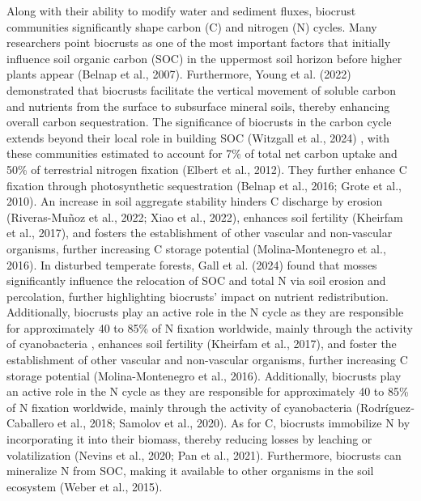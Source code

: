 Along with their ability to modify water and sediment fluxes, biocrust communities significantly shape carbon (C) and nitrogen (N) cycles. Many researchers point biocrusts as one of the most important factors that initially influence soil organic carbon (SOC) in the uppermost soil horizon before higher plants appear (Belnap et al., 2007). Furthermore, Young et al. (2022) demonstrated that biocrusts facilitate the vertical movement of soluble carbon and nutrients from the surface to subsurface mineral soils, thereby enhancing overall carbon sequestration. The significance of biocrusts in the carbon cycle extends beyond their local role in building SOC (Witzgall et al., 2024) , with these communities estimated to account for 7\% of total net carbon uptake and 50\% of terrestrial nitrogen fixation (Elbert et al., 2012). They further enhance C fixation through photosynthetic sequestration (Belnap et al., 2016; Grote et al., 2010). An increase in soil aggregate stability hinders C discharge by erosion (Riveras-Muñoz et al., 2022; Xiao et al., 2022), enhances soil fertility (Kheirfam et al., 2017), and fosters the establishment of other vascular and non-vascular organisms, further increasing C storage potential (Molina-Montenegro et al., 2016). In disturbed temperate forests, Gall et al. (2024) found that mosses significantly influence the relocation of SOC and total N via soil erosion and percolation, further highlighting biocrusts’ impact on nutrient redistribution. Additionally, biocrusts play an active role in the N cycle as they are responsible for approximately 40 to 85\% of N fixation worldwide, mainly through the activity of cyanobacteria , enhances soil fertility (Kheirfam et al., 2017), and foster the establishment of other vascular and non-vascular organisms, further increasing C storage potential (Molina-Montenegro et al., 2016). Additionally, biocrusts play an active role in the N cycle as they are responsible for approximately 40 to 85\% of N fixation worldwide, mainly through the activity of cyanobacteria (Rodríguez‐Caballero et al., 2018; Samolov et al., 2020). As for C, biocrusts immobilize N by incorporating it into their biomass, thereby reducing losses by leaching or volatilization (Nevins et al., 2020; Pan et al., 2021). Furthermore, biocrusts can mineralize N from SOC, making it available to other organisms in the soil ecosystem (Weber et al., 2015).


